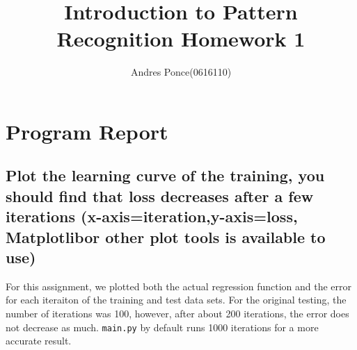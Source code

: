 \documentclass{article}
\title{Introduction to Pattern Recognition Homework 1}
\author{Andres Ponce(0616110)}
\begin{document}
\maketitle

\section{Program Report} %

		\subsection{Plot the learning curve of the training, you should 
				find that loss decreases after a few iterations 
				(x-axis=iteration,y-axis=loss, Matplotlibor other plot tools is available to use)}

				For this assignment, we plotted both the actual regression function and the error
				for each iteraiton of the training and test data sets. For the original testing, 
				the number of iterations was 100, however, after about 200 iterations, the error
				does not decrease as much. \texttt{main.py} by default runs 1000 iterations for a 
				more accurate result.
\end{document}
